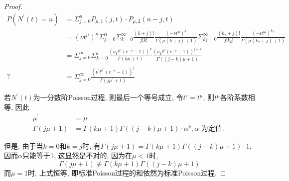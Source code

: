 \documentclass[a4paper, 12pt]{ctexart}
\begin{document}
\begin{proof}
\begin{equation}
\begin{split}
P(N^{\prime}(t)=n)&=\Sigma _{j=0}^n P_{\mu ,   1}(j,   t)\cdot P_{\mu ,   2}(n-j,   t)\\
&=(\nu t^{\mu})^n \Sigma _{j=0}^n \Sigma _{k=0}^{\infty}\frac {(k+j)!}{j!k!} \frac{(-\nu t^{\mu})^k}{\Gamma \left(\mu (k+j)+1\right)}\Sigma _{k_2 =0}^{\infty}\frac{(k_2 +j)!}{j!k_2 !}\frac{(-\nu t^{\mu})^{k_2}}{\Gamma (\mu \left(k_2 +j\right)+1)}\\
&=\Sigma _{j=0}^{\infty} \Sigma _{k=0}^j \frac {(\nu _1 t^{\mu}(e^{-s}-1))^k}{\Gamma (k\mu +1)}\frac{(\nu _2 t^{\mu}(e^{-s}-1))^{j-k}}{\Gamma \left((j-k)\mu +1\right)} \\
?&= \Sigma _{j=0}^{\infty}\frac{\left(\nu ^{\prime}t^{\mu ^{\prime}}(e^{-s}-1)\right)^j}{\Gamma (j\mu ^{\prime} +1)}
\end{split}
\end{equation}

若$N^{\prime}(t)$为一分数阶Poisson过程,   则最后一个等号成立,   令$t'=t^{\mu}$,   则$t^{\mu}$各阶系数相等,   因此
\begin{align}
\mu^{\prime}&=\mu\\
\Gamma(j\mu +1)&=\Gamma(k\mu +1)\Gamma((j-k)\mu +1)\cdot\alpha ^k,   \text{$\alpha$ 为定值. }
\end{align}

但是, 由于当$k=0$和$k=j$时,   有$\Gamma(j\mu +1)=\Gamma(k\mu +1)\Gamma((j-k)\mu +1)\cdot1$,   因而$\alpha$只能等于1,   这显然是不对的,   因为在$\mu<1$时,   
\begin{equation}
\Gamma(j\mu +1)\not\equiv\Gamma(k\mu +1)\Gamma\left((j-k)\mu +1\right)
\end{equation}
而$\mu =1$时,   上式恒等,   即标准Poisson过程的和依然为标准Poisson过程. 

\end{proof}
\end{document}
